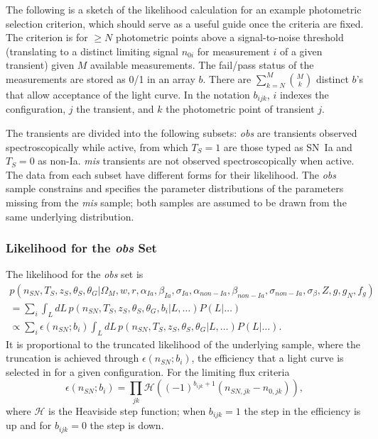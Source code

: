 \documentclass[preprint,3p]{elsarticle}
\begin{document}


The following is a sketch of the likelihood calculation for an example 
photometric selection criterion, which should serve as a useful guide once the criteria are fixed.
The criterion is for $\ge N$ photometric points
above a signal-to-noise threshold (translating to a distinct limiting signal $n_{0i}$
for measurement $i$ of a given transient) given $M$ available measurements. 
The fail/pass status of the measurements are stored as 0/1 in an array $b$.
There are $\sum_{k=N}^M \binom{M}{k}$ 
distinct $b$'s that allow acceptance of the light curve.  In the notation $b_{ijk}$, $i$ indexes
the configuration, $j$ the transient, and $k$ the photometric point of transient $j$.



The transients are divided into
the following subsets:
{\it obs} are transients observed spectroscopically while active, from which $T_S=1$ are those typed
as SN~Ia and $T_S=0$ as non-Ia.  {\it mis} transients are not observed
spectroscopically when active.  The data from each subset have different forms for their likelihood.
The  {\it obs} sample constrains and specifies the parameter distributions of the 
parameters missing from the {\it mis} sample; both samples
are assumed to be drawn from the same underlying distribution.



\subsubsection{Likelihood for the {\it obs} Set}
The likelihood for the {\it obs} set is
\begin{multline}
p(n_{SN}, {{T}}_S,{{z}}_S, \theta_{S}, \theta_G |  \Omega_M, w, r, \alpha_{Ia}, \beta_{Ia},\sigma_{Ia}, \alpha_{\mathit{non-Ia}},\beta_{\mathit{non-Ia}}, \sigma_{\mathit{non-Ia}},  \sigma_\beta, Z, g, g_N, f_g)\\
= \sum_i \int_L dL\, p(n_{SN}, {{T}}_S,{{z}}_S, \theta_{S}, \theta_G , b_i|  L, \ldots)
 P(L|\ldots) \\
 \propto \sum_i  \epsilon(n_{SN}; b_{i}) \int_L dL\, p(n_{SN}, {{T}}_S,{{z}}_S, \theta_{S}, \theta_G|  L, \ldots)P(L|\ldots).
\end{multline} 
It is proportional to the truncated likelihood of the underlying sample, where the truncation
is achieved through $\epsilon(n_{SN}; b_{i})$, the efficiency that a light curve is 
selected in for a given configuration.  For the limiting flux criteria
\begin{equation}
\epsilon(n_{SN}; b_{i})= \prod_{jk}\mathcal{H}\left((-1)^{b_{ijk}+1}(n_{SN,jk}-n_{0,jk})\right),
\end{equation}
where $\mathcal{H}$ is the Heaviside step function; when $b_{ijk}=1$ the step in the efficiency
is up and for $b_{ijk}=0$ the step is down.
\end{document}
